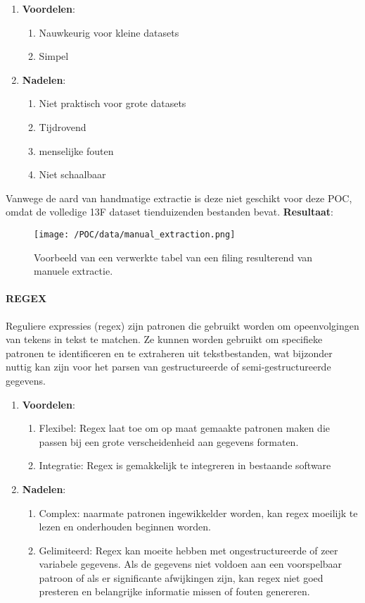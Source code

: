 \begin{enumerate}
    \item \textbf{Voordelen}:
    \begin{enumerate}
        \item Nauwkeurig voor kleine datasets
        \item Simpel
    \end{enumerate}
    \item \textbf{Nadelen}:
    \begin{enumerate}
        \item Niet praktisch voor grote datasets
        \item Tijdrovend
        \item menselijke fouten
        \item Niet schaalbaar
    \end{enumerate}
\end{enumerate}
Vanwege de aard van handmatige extractie is deze niet geschikt voor deze POC, omdat de volledige 13F dataset tienduizenden bestanden bevat.
\textbf{Resultaat}: 
\begin{figure}[H]
    \centering        
    \texttt{[image: /POC/data/manual\_extraction.png]}
    \caption{Voorbeeld van een verwerkte tabel van een filing resulterend van manuele extractie.}
    \label{fig:table_proc}
\end{figure}

\paragraph{REGEX}
Reguliere expressies (regex) zijn patronen die gebruikt worden om opeenvolgingen van tekens in tekst te matchen. Ze kunnen worden gebruikt om specifieke patronen te identificeren en te extraheren uit tekstbestanden, wat bijzonder nuttig kan zijn voor het parsen van gestructureerde of semi-gestructureerde gegevens.
\begin{enumerate}
    \item \textbf{Voordelen}:
    \begin{enumerate}
        \item Flexibel: Regex laat toe om op maat gemaakte patronen maken die passen bij een grote verscheidenheid aan gegevens formaten.
        \item Integratie: Regex is gemakkelijk te integreren in bestaande software
    \end{enumerate}
    \item \textbf{Nadelen}:
    \begin{enumerate}
        \item Complex: naarmate patronen ingewikkelder worden, kan regex moeilijk te lezen en onderhouden beginnen worden.
        \item Gelimiteerd: Regex kan moeite hebben met ongestructureerde of zeer variabele gegevens. Als de gegevens niet voldoen aan een voorspelbaar patroon of als er significante afwijkingen zijn, kan regex niet goed presteren en belangrijke informatie missen of fouten genereren.
    \end{enumerate}
\end{enumerate}

